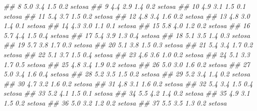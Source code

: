 \documentclass[
  13,
  letterpaper,
]{report}
\newenvironment{Shaded}{\begin{snugshade}}{\end{snugshade}}
\newcommand{\DocumentationTok}[1]{\textcolor[rgb]{0.37,0.37,0.37}{\textit{#1}}}
\begin{document}
\begin{Shaded}
\begin{Highlighting}[]
\DocumentationTok{\#\# 8            5.0         3.4          1.5         0.2     setosa}
\DocumentationTok{\#\# 9            4.4         2.9          1.4         0.2     setosa}
\DocumentationTok{\#\# 10           4.9         3.1          1.5         0.1     setosa}
\DocumentationTok{\#\# 11           5.4         3.7          1.5         0.2     setosa}
\DocumentationTok{\#\# 12           4.8         3.4          1.6         0.2     setosa}
\DocumentationTok{\#\# 13           4.8         3.0          1.4         0.1     setosa}
\DocumentationTok{\#\# 14           4.3         3.0          1.1         0.1     setosa}
\DocumentationTok{\#\# 15           5.8         4.0          1.2         0.2     setosa}
\DocumentationTok{\#\# 16           5.7         4.4          1.5         0.4     setosa}
\DocumentationTok{\#\# 17           5.4         3.9          1.3         0.4     setosa}
\DocumentationTok{\#\# 18           5.1         3.5          1.4         0.3     setosa}
\DocumentationTok{\#\# 19           5.7         3.8          1.7         0.3     setosa}
\DocumentationTok{\#\# 20           5.1         3.8          1.5         0.3     setosa}
\DocumentationTok{\#\# 21           5.4         3.4          1.7         0.2     setosa}
\DocumentationTok{\#\# 22           5.1         3.7          1.5         0.4     setosa}
\DocumentationTok{\#\# 23           4.6         3.6          1.0         0.2     setosa}
\DocumentationTok{\#\# 24           5.1         3.3          1.7         0.5     setosa}
\DocumentationTok{\#\# 25           4.8         3.4          1.9         0.2     setosa}
\DocumentationTok{\#\# 26           5.0         3.0          1.6         0.2     setosa}
\DocumentationTok{\#\# 27           5.0         3.4          1.6         0.4     setosa}
\DocumentationTok{\#\# 28           5.2         3.5          1.5         0.2     setosa}
\DocumentationTok{\#\# 29           5.2         3.4          1.4         0.2     setosa}
\DocumentationTok{\#\# 30           4.7         3.2          1.6         0.2     setosa}
\DocumentationTok{\#\# 31           4.8         3.1          1.6         0.2     setosa}
\DocumentationTok{\#\# 32           5.4         3.4          1.5         0.4     setosa}
\DocumentationTok{\#\# 33           5.2         4.1          1.5         0.1     setosa}
\DocumentationTok{\#\# 34           5.5         4.2          1.4         0.2     setosa}
\DocumentationTok{\#\# 35           4.9         3.1          1.5         0.2     setosa}
\DocumentationTok{\#\# 36           5.0         3.2          1.2         0.2     setosa}
\DocumentationTok{\#\# 37           5.5         3.5          1.3         0.2     setosa}

\end{Highlighting}
\end{Shaded}
\end{document}
